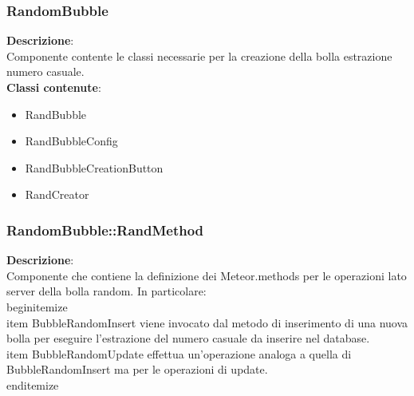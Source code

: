 \clearpage

\subsubsection{RandomBubble}
   \FloatBarrier
\FloatBarrier
\textbf{Descrizione}:\\
 Componente contente le classi necessarie per la creazione della bolla estrazione numero casuale. 
\\ \textbf{Classi contenute}:\\
\begin{itemize}
\item RandBubble
\item RandBubbleConfig
\item RandBubbleCreationButton
\item RandCreator
\end{itemize}


\clearpage

\subsubsection{RandomBubble::RandMethod}
\textbf{Descrizione}:\\
 Componente che contiene la definizione dei Meteor.methods per le operazioni lato server della bolla random.  In particolare:
\\begin{itemize}
\\item BubbleRandomInsert viene invocato dal metodo di inserimento di una nuova bolla per eseguire l'estrazione del numero casuale da inserire nel database.
\\item  BubbleRandomUpdate effettua un'operazione analoga a quella di BubbleRandomInsert ma per le operazioni di update.
\\end{itemize} 


